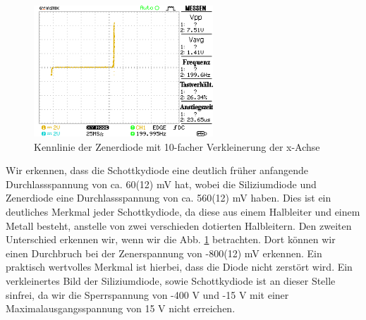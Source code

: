 \documentclass[a4paper,10pt]{article}
\numberwithin{equation}{section}
\begin{document}
\begin{figure}[h]
	\centering
	\includegraphics[width=0.6\textwidth]{data/Kennlinie_a1_zd_fern.BMP.png}
	\caption{Kennlinie der Zenerdiode mit 10-facher Verkleinerung der x-Achse}
	\label{fig:2.4}
\end{figure}
Wir erkennen, dass die Schottkydiode eine deutlich früher anfangende Durchlassspannung von ca. 60(12) mV hat, wobei die Siliziumdiode und Zenerdiode eine Durchlassspannung von ca. 560(12) mV haben. Dies ist ein deutliches Merkmal jeder Schottkydiode, da diese aus einem Halbleiter und einem Metall besteht, anstelle von zwei verschieden dotierten Halbleitern. Den zweiten Unterschied erkennen wir, wenn wir die Abb. \ref{fig:2.4} betrachten. Dort können wir einen Durchbruch bei der Zenerspannung von -800(12) mV erkennen. Ein praktisch wertvolles Merkmal ist hierbei, dass die Diode nicht zerstört wird. Ein verkleinertes Bild der Siliziumdiode, sowie Schottkydiode ist an dieser Stelle sinfrei, da wir die Sperrspannung von -400 V und -15 V mit einer Maximalausgangsspannung von 15 V nicht erreichen.
\end{document}
